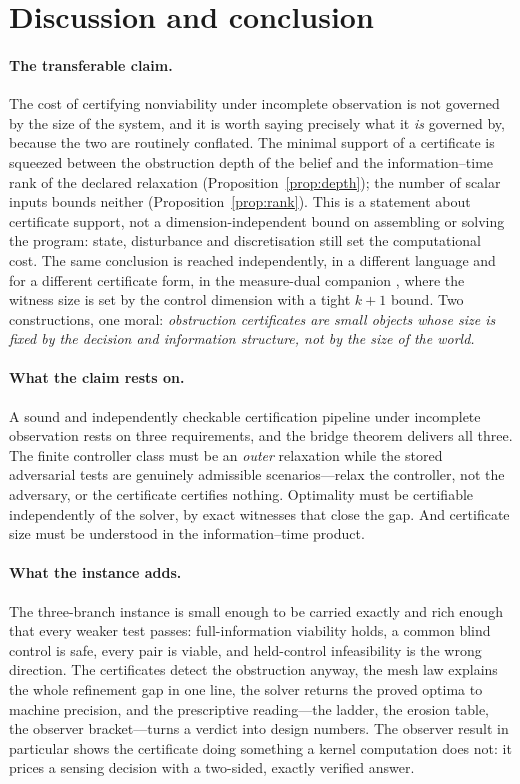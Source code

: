 \section{Discussion and conclusion}\label{sec:discussion}

\paragraph{The transferable claim.}
The cost of certifying nonviability under incomplete observation is not governed by the size of the system, and it is worth saying precisely what it \emph{is} governed by, because the two are routinely conflated. The minimal support of a certificate is squeezed between the obstruction depth of the belief and the information--time rank of the declared relaxation (Proposition~\ref{prop:depth}); the number of scalar inputs bounds neither (Proposition~\ref{prop:rank}). This is a statement about certificate support, not a dimension-independent bound on assembling or solving the program: state, disturbance and discretisation still set the computational cost. The same conclusion is reached independently, in a different language and for a different certificate form, in the measure-dual companion \cite{Abaee2026minimax}, where the witness size is set by the control dimension with a tight $k+1$ bound. Two constructions, one moral: \emph{obstruction certificates are small objects whose size is fixed by the decision and information structure, not by the size of the world.}

\paragraph{What the claim rests on.}
A sound and independently checkable certification pipeline under incomplete observation rests on three requirements, and the bridge theorem delivers all three. The finite controller class must be an \emph{outer} relaxation while the stored adversarial tests are genuinely admissible scenarios---relax the controller, not the adversary, or the certificate certifies nothing. Optimality must be certifiable independently of the solver, by exact witnesses that close the gap. And certificate size must be understood in the information--time product.

\paragraph{What the instance adds.}
The three-branch instance is small enough to be carried exactly and rich enough that every weaker test passes: full-information viability holds, a common blind control is safe, every pair is viable, and held-control infeasibility is the wrong direction. The certificates detect the obstruction anyway, the mesh law explains the whole refinement gap in one line, the solver returns the proved optima to machine precision, and the prescriptive reading---the ladder, the erosion table, the observer bracket---turns a verdict into design numbers. The observer result in particular shows the certificate doing something a kernel computation does not: it prices a sensing decision with a two-sided, exactly verified answer.

